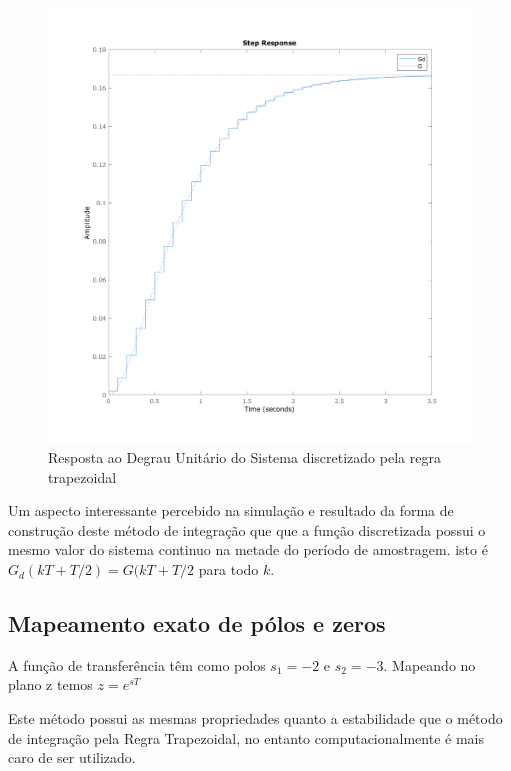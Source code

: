 \documentclass[a4paper,11pt]{article}
\begin{document}
\begin{figure}[H]
    \centering
    \includegraphics[width=0.8\linewidth]{img/exsim2-plot-g-trap.png}
    \caption{Resposta ao Degrau Unitário do Sistema discretizado pela regra trapezoidal}
\end{figure}

Um aspecto interessante percebido na simulação e resultado da forma de construção deste método de integração que que a função discretizada possui o mesmo valor do sistema continuo na metade do período de amostragem. isto é $G_d(kT+T/2) = G(kT+T/2$ para todo $k$.

\subsection{Mapeamento exato de pólos e zeros}

A função de transferência têm como polos $s_1=-2$ e $s_2=-3$. Mapeando no plano z temos $z = e^{sT}$

Este método possui as mesmas propriedades quanto a estabilidade que o método de integração pela Regra Trapezoidal, no entanto computacionalmente é mais caro de ser utilizado.
\end{document}
